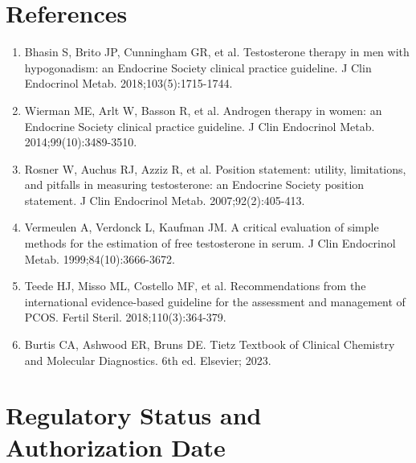 \section*{References}
\begin{enumerate}
  \item Bhasin S, Brito JP, Cunningham GR, et al. Testosterone therapy in men with hypogonadism: an Endocrine Society clinical practice guideline. J Clin Endocrinol Metab. 2018;103(5):1715-1744.
  \item Wierman ME, Arlt W, Basson R, et al. Androgen therapy in women: an Endocrine Society clinical practice guideline. J Clin Endocrinol Metab. 2014;99(10):3489-3510.
  \item Rosner W, Auchus RJ, Azziz R, et al. Position statement: utility, limitations, and pitfalls in measuring testosterone: an Endocrine Society position statement. J Clin Endocrinol Metab. 2007;92(2):405-413.
  \item Vermeulen A, Verdonck L, Kaufman JM. A critical evaluation of simple methods for the estimation of free testosterone in serum. J Clin Endocrinol Metab. 1999;84(10):3666-3672.
  \item Teede HJ, Misso ML, Costello MF, et al. Recommendations from the international evidence-based guideline for the assessment and management of PCOS. Fertil Steril. 2018;110(3):364-379.
  \item Burtis CA, Ashwood ER, Bruns DE. Tietz Textbook of Clinical Chemistry and Molecular Diagnostics. 6th ed. Elsevier; 2023.
\end{enumerate}




\clearpage
\section*{Regulatory Status and Authorization Date}

\clearpage

